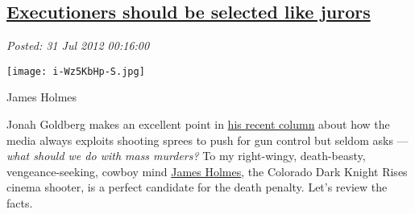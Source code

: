%


\subsection*{\href{https://bakerjd99.wordpress.com/2012/07/30/executioners-should-be-selected-like-jurors/}{Executioners should be selected like jurors}}


\noindent\emph{Posted: 31 Jul 2012 00:16:00}
\vspace{6pt}



\captionsetup[floatingfigure]{labelformat=empty}
\begin{floatingfigure}[r]{0.18\textwidth}
\centering
\texttt{[image: i-Wz5KbHp-S.jpg]}
\caption{James Holmes}
\label{fig:3089X0}
\end{floatingfigure}Jonah Goldberg makes an excellent point in
\href{http://www.baltimoresun.com/news/opinion/oped/bs-ed-goldberg-death-penalty-20120730,0,6792851.story}{his
recent column} about how the media always exploits shooting sprees to
push for gun control but seldom asks --- \emph{what should we do with
mass murders?} To my right-wingy, death-beasty, vengeance-seeking,
cowboy mind
\href{http://www.washingtonpost.com/national/james-holmes-expected-to-be-charged-monday-in-colorado-massacre/2012/07/30/gJQAFCRQKX\_story.html}{James
Holmes}, the Colorado Dark Knight Rises cinema shooter, is a perfect
candidate for the death penalty. Let's review the facts.
\captionsetup[floatingfigure]{labelformat=empty}


